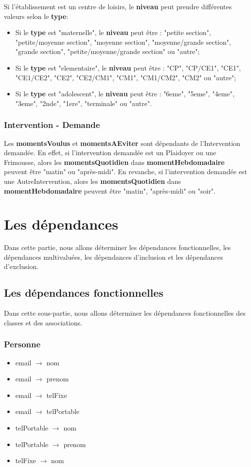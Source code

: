 \documentclass[asi, sansVersion]{picInsa}
\begin{document}
Si l'établissement est un centre de loisirs, le \textbf{niveau} peut prendre différentes valeurs selon le \textbf{type}:
\begin{itemize}
\item Si le \textbf{type} est "maternelle", le \textbf{niveau} peut être : "petite section", "petite/moyenne section", "moyenne section", "moyenne/grande section", "grande section", "petite/moyenne/grande section" ou "autre";
\item Si le \textbf{type} est "elementaire", le \textbf{niveau} peut être : "CP", "CP/CE1", "CE1", "CE1/CE2", "CE2", "CE2/CM1", "CM1", "CM1/CM2", "CM2" ou "autre";
\item Si le \textbf{type} est "adolescent", le \textbf{niveau} peut être : "6eme", "5eme", "4eme", "3eme", "2nde", "1ere", "terminale" ou "autre". 
\end{itemize}

\subsection*{Intervention - Demande}
Les \textbf{momentsVoulus} et \textbf{momentsAEviter} sont dépendants de l'Intervention demandée. En effet, si l'intervention demandée est un Plaidoyer ou une Frimousse, alors les \textbf{momentsQuotidien} dans \textbf{momentHebdomadaire} peuvent être "matin" ou "après-midi". En revanche, si l'intervention demandée est une AutreIntervention, alors les \textbf{momentsQuotidien} dans \textbf{momentHebdomadaire} peuvent être "matin", "après-midi" ou "soir". 
  

\chapter{Les dépendances}

Dans cette partie, nous allons déterminer les dépendances fonctionnelles, les dépendances multivaluées,  les dépendances d'inclusion et les dépendances d'exclusion. \\

\section{Les dépendances fonctionnelles}

Dans cette sous-partie, nous allons déterminer les dépendances fonctionnelles des classes et des associations.  

\subsection*{Personne}
\begin{itemize}
\item[] email $\rightarrow$ nom 
\item[] email $\rightarrow$ prenom 
\item[] email $\rightarrow$ telFixe 
\item[] email $\rightarrow$ telPortable 
\item[] telPortable $\rightarrow$ nom
\item[] telPortable $\rightarrow$ prenom
\item[] telFixe $\rightarrow$ nom
\end{itemize}
\end{document}
